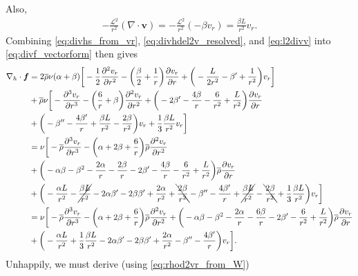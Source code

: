 \documentclass[12pt]{article} %
\newcommand{\pderiv}[2]{\frac{\partial#1}{\partial#2}}
\newcommand{\ppderiv}[2]{\frac{\partial^2#1}{\partial#2^2}}
\newcommand{\pppderiv}[2]{\frac{\partial^3#1}{\partial#2^3}}
\newcommand{\rhobar}{\overline{\rho}}
\newcommand{\Div}{\nabla\cdot}
\newcommand{\divh}{\nabla_h\cdot}
\newcommand{\db}{\beta^\prime}
\newcommand{\ddb}{\beta^{\prime\prime}}
\begin{document}
	Also,
	\begin{align}
	-\frac{\mathscr{L}^2}{r^2}(\Div\bm{v}) = -\frac{\mathscr{L}^2}{r^2}(-\beta v_r) = \frac{\beta L}{r^2}v_r.
	\label{eq:l2divv}
	\end{align}
	Combining \eqref{eq:divhs_from_vr}, \eqref{eq:divhdel2v_resolved}, and \eqref{eq:l2divv} into \eqref{eq:divf_vectorform} then gives
	\begin{align}
	\divh\bm{f} &= 2\rhobar\nu(\alpha+\beta)\bigg{[}-\frac{1}{2}\ppderiv{v_r}{r}-\bigg{(}\frac{\beta}{2}+\frac{1}{r}\bigg{)}\pderiv{v_r}{r} +\bigg{(}-\frac{L}{2r^2}-\beta^\prime+\frac{1}{r^2}\bigg{)}v_r\bigg{]}\nonumber\\
	&+\rhobar\nu\bigg{[} -\pppderiv{v_r}{r} - \bigg{(}\frac{6}{r}+\beta\bigg{)}\ppderiv{v_r}{r}+\bigg{(}-2\db -\frac{4\beta}{r} -\frac{6}{r^2} + \frac{L}{r^2}\bigg{)}\pderiv{v_r}{r}\nonumber\\
	&+\bigg{(}-\ddb - \frac{4\db}{r} + \frac{\beta L}{r^2} -\frac{2\beta}{r^2} \bigg{)}v_r + \frac{1}{3}\frac{\beta L}{r^2}v_r\bigg{]}\nonumber\\
	&=\nu\bigg{[}-\rhobar\pppderiv{v_r}{r} - \bigg{(}\alpha + 2\beta + \frac{6}{r}\bigg{)}\rhobar\ppderiv{v_r}{r} \nonumber\\
	&+ \bigg{(}-\alpha\beta-\beta^2-\frac{2\alpha}{r}-\frac{2\beta}{r}-2\db - \frac{4\beta}{r} - \frac{6}{r^2}+\frac{L}{r^2}\bigg{)}\rhobar\pderiv{v_r}{r}\nonumber\\
	&+ \bigg{(}-\frac{\alpha L}{r^2} - \cancel{\frac{\beta L}{r^2}}- 2\alpha\db - 2\beta\db + \frac{2\alpha}{r^2}+\bcancel{\frac{2\beta}{r^2}} - \ddb - \frac{4\db}{r} + \cancel{\frac{\beta L}{r^2}} - \bcancel{\frac{2\beta}{r^2}} + \frac{1}{3}\frac{\beta L}{r^2}\bigg{)}v_r\bigg{]}\nonumber\\
	&=\nu\bigg{[}-\rhobar\pppderiv{v_r}{r} - \bigg{(}\alpha + 2\beta + \frac{6}{r}\bigg{)}\rhobar\ppderiv{v_r}{r} + \bigg{(}-\alpha\beta-\beta^2-\frac{2\alpha}{r}-\frac{6\beta}{r}-2\db - \frac{6}{r^2}+\frac{L}{r^2}\bigg{)}\rhobar\pderiv{v_r}{r}\nonumber\\
&+ \bigg{(}-\frac{\alpha L}{r^2} +\frac{1}{3}\frac{\beta L}{r^2}- 2\alpha\db - 2\beta\db + \frac{2\alpha}{r^2} - \ddb - \frac{4\db}{r}\bigg{)}v_r\bigg{]}.
\label{eq:divf_fromvr}
	\end{align}	
	Unhappily, we must derive (using \eqref{eq:rhod2vr_from_W})
\end{document}

